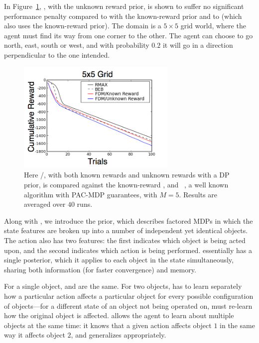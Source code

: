 In Figure~\ref{fig:grids}, , with the unknown reward prior, is shown to suffer no significant performance penalty compared to  with the known-reward prior and to  (which also uses the known-reward prior). The domain is a $5\times 5$ grid world, where the agent must find its way from one corner to the other. The agent can choose to go north, east, south or west, and with probability $0.2$ it will go in a direction perpendicular to the one intended.



\begin{figure}
\vskip 0.2in
\begin{center}
\centerline{\includegraphics[width=3in]{grids}}
\caption{
Here /, with both known rewards and unknown rewards with a DP prior, is compared against the known-reward , and ~\cite{brafman02}, a well known algorithm with PAC-MDP guarantees, with $M=5$. Results are averaged over $40$ runs.
}
\label{fig:grids}
\end{center}
\vskip -0.2in
\end{figure} 

Along with , we introduce the  prior, which describes factored MDPs in which the state features are broken up into a number of independent yet identical objects. The action also has two features: the first indicates which object is being acted upon, and the second indicates which action is being performed.  essentially has a single  posterior, which it applies to each object in the state simultaneously, sharing both information (for faster convergence) and memory.


For a single object,  and  are the same. For two objects,  has to learn separately how a particular action affects a particular object for every possible configuration of objects---for a different state of an object not being operated on,  must re-learn how the original object is affected.  allows the agent to learn about multiple objects at the same time: it knows that a given action affects object $1$ in the same way it affects object $2$, and generalizes appropriately.

